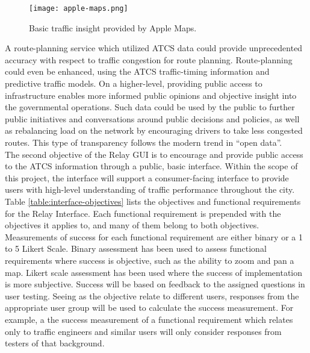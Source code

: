 \documentclass{article}
\begin{document}
\begin{figure}[htbp!]
  \begin{centering}
    \texttt{[image: apple-maps.png]}
    \caption{Basic traffic insight provided by Apple Maps.}
    \label{fig:apple-maps}
  \end{centering}
\end{figure}

A route-planning service which utilized ATCS data could provide unprecedented accuracy with respect to traffic congestion for route planning.
Route-planning could even be enhanced, using the ATCS traffic-timing information and predictive traffic models.
On a higher-level, providing public access to infrastructure enables more informed public opinions and objective insight into the governmental operations.
Such data could be used by the public to further public initiatives and conversations around public decisions and policies, as well as rebalancing load on the network by encouraging drivers to take less congested routes.
This type of transparency follows the modern trend in ``open data''.\\

The second objective of the Relay GUI is to encourage and provide public access to the ATCS information through a public, basic interface.
Within the scope of this project, the interface will support a consumer-facing interface to provide users with high-level understanding of traffic performance throughout the city.\\

Table \ref{table:interface-objectives} lists the objectives and functional requirements for the Relay Interface.
Each functional requirement is prepended with the objectives it applies to, and many of them belong to both objectives.
Measurements of success for each functional requirement are either binary or a 1 to 5 Likert Scale.
Binary assessment has been used to assess functional requirements where success is objective, such as the ability to zoom and pan a map.
Likert scale assessment has been used where the success of implementation is more subjective.
Success will be based on feedback to the assigned questions in user testing.
Seeing as the objective relate to different users, responses from the appropriate user group will be used to calculate the success measurement.
For example, a the success measurement of a functional requirement which relates only to traffic engineers and similar users will only consider responses from testers of that background. \\
\end{document}
